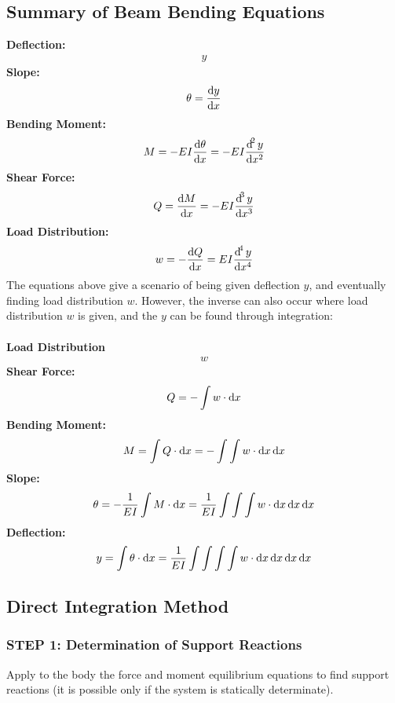 \subsection{Summary of Beam Bending Equations}
\textbf{Deflection:}
\begin{gather}
  y
\end{gather}
\textbf{Slope:}
\begin{gather}
  \theta = \frac{\dif y}{\dif x}
\end{gather}
\textbf{Bending Moment:}
\begin{gather}
  M = -EI\frac{\dif \theta}{\dif x} = -EI\frac{\dif^2y}{\dif x^2}
\end{gather}
\textbf{Shear Force:}
\begin{gather}
  Q = \frac{\dif M}{\dif x} = -EI\frac{\dif^3y}{\dif x^3}
\end{gather}
\textbf{Load Distribution:}
\begin{gather}
  w = -\frac{\dif Q}{\dif x} = EI\frac{\dif^4y}{\dif x^4}
\end{gather}
The equations above give a scenario of being given deflection $y$, and eventually finding load distribution $w$. However, the inverse can also occur where load distribution $w$ is given, and the $y$ can be found through integration: \\\\
\textbf{Load Distribution}
\begin{gather}
  w
\end{gather}
\textbf{Shear Force:}
\begin{gather}
  Q = -\int w \cdot \dif x
\end{gather}
\textbf{Bending Moment:}
\begin{gather}
  M = \int Q \cdot \dif x = -\int \int w \cdot \dif x \dif x
\end{gather}
\textbf{Slope:}
\begin{gather}
  \theta = -\frac{1}{EI}\int M \cdot \dif x = \frac{1}{EI}\int \int \int w \cdot \dif x \dif x \dif x
\end{gather}
\textbf{Deflection:}
\begin{gather}
  y = \int \theta \cdot \dif x = \frac{1}{EI}\int \int \int \int w \cdot \dif x \dif x \dif x \dif x
\end{gather}
\subsection{Direct Integration Method}
\subsubsection{STEP 1: Determination of Support Reactions}
Apply to the body the force and moment equilibrium equations to find support reactions (it is possible only if the system is statically determinate).
